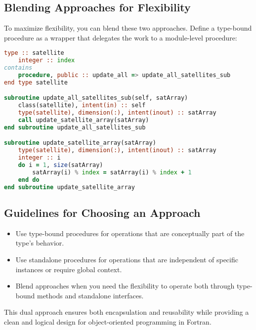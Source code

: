 \subsection{Blending Approaches for Flexibility}

To maximize flexibility, you can blend these two approaches. Define a type-bound procedure as a wrapper that delegates the work to a module-level procedure:
\begin{lstlisting}[language=Fortran]
type :: satellite
    integer :: index
contains
    procedure, public :: update_all => update_all_satellites_sub
end type satellite

subroutine update_all_satellites_sub(self, satArray)
    class(satellite), intent(in) :: self
    type(satellite), dimension(:), intent(inout) :: satArray
    call update_satellite_array(satArray)
end subroutine update_all_satellites_sub

subroutine update_satellite_array(satArray)
    type(satellite), dimension(:), intent(inout) :: satArray
    integer :: i
    do i = 1, size(satArray)
        satArray(i) % index = satArray(i) % index + 1
    end do
end subroutine update_satellite_array
\end{lstlisting}

\subsection{Guidelines for Choosing an Approach}

\begin{itemize}
    \item Use type-bound procedures for operations that are conceptually part of the type’s behavior.
    \item Use standalone procedures for operations that are independent of specific instances or require global context.
    \item Blend approaches when you need the flexibility to operate both through type-bound methods and standalone interfaces.
\end{itemize}

This dual approach ensures both encapsulation and reusability while providing a clean and logical design for object-oriented programming in Fortran.

\endinput  %
